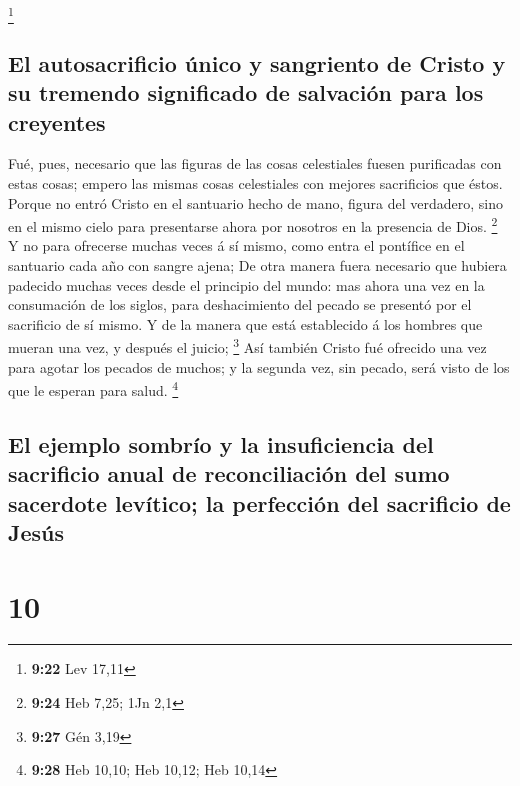 \footnote{\textbf{9:22} Lev 17,11}

\hypertarget{el-autosacrificio-uxfanico-y-sangriento-de-cristo-y-su-tremendo-significado-de-salvaciuxf3n-para-los-creyentes}{%
\subsection{El autosacrificio único y sangriento de Cristo y su tremendo
significado de salvación para los
creyentes}\label{el-autosacrificio-uxfanico-y-sangriento-de-cristo-y-su-tremendo-significado-de-salvaciuxf3n-para-los-creyentes}}

 Fué, pues, necesario que las figuras de las cosas
celestiales fuesen purificadas con estas cosas; empero las mismas cosas
celestiales con mejores sacrificios que éstos.  Porque no
entró Cristo en el santuario hecho de mano, figura del verdadero, sino
en el mismo cielo para presentarse ahora por nosotros en la presencia de
Dios. \footnote{\textbf{9:24} Heb 7,25; 1Jn 2,1}  Y no para
ofrecerse muchas veces á sí mismo, como entra el pontífice en el
santuario cada año con sangre ajena;  De otra manera fuera
necesario que hubiera padecido muchas veces desde el principio del
mundo: mas ahora una vez en la consumación de los siglos, para
deshacimiento del pecado se presentó por el sacrificio de sí mismo.
 Y de la manera que está establecido á los hombres que
mueran una vez, y después el juicio; \footnote{\textbf{9:27} Gén 3,19}
 Así también Cristo fué ofrecido una vez para agotar los
pecados de muchos; y la segunda vez, sin pecado, será visto de los que
le esperan para salud. \footnote{\textbf{9:28} Heb 10,10; Heb 10,12; Heb
  10,14}

\hypertarget{el-ejemplo-sombruxedo-y-la-insuficiencia-del-sacrificio-anual-de-reconciliaciuxf3n-del-sumo-sacerdote-levuxedtico-la-perfecciuxf3n-del-sacrificio-de-jesuxfas}{%
\subsection{El ejemplo sombrío y la insuficiencia del sacrificio anual
de reconciliación del sumo sacerdote levítico; la perfección del
sacrificio de
Jesús}\label{el-ejemplo-sombruxedo-y-la-insuficiencia-del-sacrificio-anual-de-reconciliaciuxf3n-del-sumo-sacerdote-levuxedtico-la-perfecciuxf3n-del-sacrificio-de-jesuxfas}}

\hypertarget{section-9}{%
\section{10}\label{section-9}}

